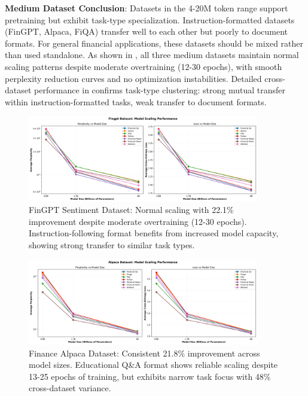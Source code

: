 \textbf{Medium Dataset Conclusion}: Datasets in the 4-20M token range support pretraining but exhibit task-type specialization. Instruction-formatted datasets (FinGPT, Alpaca, FiQA) transfer well to each other but poorly to document formats. For general financial applications, these datasets should be mixed rather than used standalone. As shown in , all three medium datasets maintain normal scaling patterns despite moderate overtraining (12-30 epochs), with smooth perplexity reduction curves and no optimization instabilities. Detailed cross-dataset performance in  confirms task-type clustering: strong mutual transfer within instruction-formatted tasks, weak transfer to document formats.

\begin{figure}[h]
\centering
\includegraphics[width=0.9\textwidth]{figures/scaling_fingpt.png}
\caption[FinGPT Sentiment Dataset: Scaling Behavior]{FinGPT Sentiment Dataset: Normal scaling with 22.1\% improvement despite moderate overtraining (12-30 epochs). Instruction-following format benefits from increased model capacity, showing strong transfer to similar task types.}
\label{fig:scaling_fingpt}
\end{figure}

\begin{figure}[h]
\centering
\includegraphics[width=0.9\textwidth]{figures/scaling_alpaca.png}
\caption[Finance Alpaca Dataset: Scaling Behavior]{Finance Alpaca Dataset: Consistent 21.8\% improvement across model sizes. Educational Q\&A format shows reliable scaling despite 13-25 epochs of training, but exhibits narrow task focus with 48\% cross-dataset variance.}
\label{fig:scaling_alpaca}
\end{figure}

